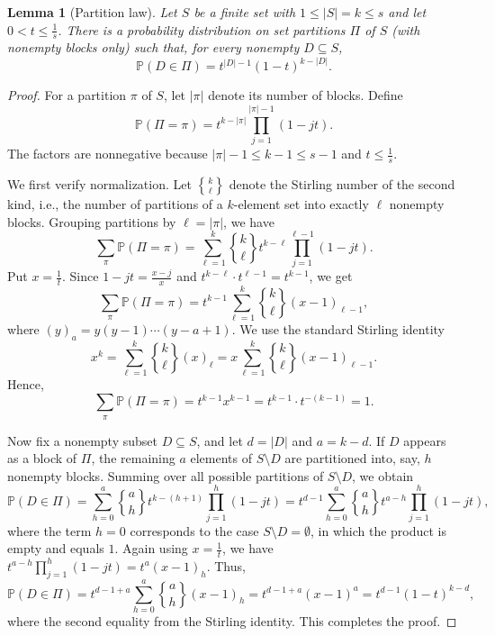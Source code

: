 \documentclass[11pt]{article}
\newtheorem{lemma}[theorem]{Lemma}
\begin{document}
\begin{lemma}[Partition law]\label{lem:partition}
Let $S$ be a finite set with $1\leq |S|=k\le s$ and let $0<t\le\frac{1}{s}$.  There is a
probability distribution on set partitions $\Pi$ of $S$ (with nonempty blocks only) such that, for every
nonempty $D\subseteq S$,
$$
 \mathbb P(D\in\Pi)=t^{|D|-1}(1-t)^{k-|D|}.
$$
\end{lemma}
\begin{proof}



For a partition $\pi$ of $S$, let $|\pi|$ denote its number of blocks. Define
$$
\mathbb P(\Pi=\pi)=t^{k-|\pi|}\prod_{j=1}^{|\pi|-1}(1-jt). 
$$
The factors are nonnegative because $|\pi|-1\le k-1\le s-1$ and
$t\le \frac{1}{s}$.

We first verify normalization. Let $\genfrac{\{}{\}}{0pt}{}{k}{\ell}$ denote the Stirling number of the second kind, i.e., the number of partitions of a $k$-element set into exactly $\ell$ nonempty blocks. Grouping partitions by $\ell=|\pi|$, we have
$$
\sum_\pi\mathbb P(\Pi=\pi)
=\sum_{\ell=1}^k \genfrac{\{}{\}}{0pt}{}{k}{\ell} t^{k-\ell}\prod_{j=1}^{\ell-1}(1-jt).
$$
Put $x=\frac{1}{t}$. Since $1-jt=\frac{x-j}{x}$ and $t^{k-\ell}\cdot t^{\ell-1}=t^{k-1}$, we get
$$
\sum_\pi\mathbb P(\Pi=\pi)
=t^{k-1}\sum_{\ell=1}^k \genfrac{\{}{\}}{0pt}{}{k}{\ell}(x-1)_{\ell-1},
$$
where $(y)_{a}=y(y-1)\cdots(y-a+1)$. We use the standard Stirling identity 
$$
 x^k=\sum_{\ell=1}^k\genfrac{\{}{\}}{0pt}{}{k}{\ell} (x)_{\ell}=x\sum_{\ell=1}^k\genfrac{\{}{\}}{0pt}{}{k}{\ell}(x-1)_{\ell-1}.
$$
 Hence, 
$$
\sum_\pi\mathbb P(\Pi=\pi)=t^{k-1}x^{k-1}=t^{k-1}\cdot t^{-(k-1)}=1.
$$

Now fix a nonempty subset $D\subseteq S$, and let $d=|D|$ and $a=k-d$. If $D$ appears as a block of $\Pi$, the remaining $a$ elements of $S\setminus D$ are partitioned into, say, $h$ nonempty blocks. Summing over all possible partitions of $S\setminus D$, we obtain
$$
\mathbb P(D\in\Pi)
=\sum_{h=0}^a \genfrac{\{}{\}}{0pt}{}{a}{h}
t^{k-(h+1)}\prod_{j=1}^{h}(1-jt)
=t^{d-1}\sum_{h=0}^a \genfrac{\{}{\}}{0pt}{}{a}{h}
t^{a-h}\prod_{j=1}^{h}(1-jt),
$$
where the term $h=0$ corresponds to the case $S\setminus D=\emptyset$, in which the product is empty and equals $1$. 
Again using $x=\frac{1}{t}$, we have $t^{a-h}\prod_{j=1}^{h}(1-jt)=t^a(x-1)_h$. Thus,
\[
\mathbb P(D\in\Pi)
=t^{d-1+a}\sum_{h=0}^a  \genfrac{\{}{\}}{0pt}{}{a}{h}(x-1)_h
=t^{d-1+a}(x-1)^a=t^{d-1}(1-t)^{k-d},
\]
where the second equality from the  Stirling identity.
This completes the proof.
\end{proof}
\end{document}
